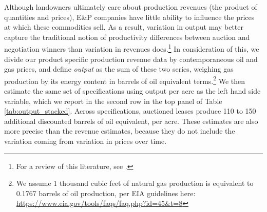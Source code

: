\documentclass[12pt]{article}
\begin{document}
Although landowners ultimately care about production revenues (the product of quantities and prices), E\&P companies have little ability to influence the prices at which these commodities sell.  As a result, variation in output may better capture the traditional notion of productivity differences between auction and negotiation winners than variation in revenues does.\footnote{For a review of this literature, see \cite{syverson2011determines}.}  In consideration of this, we divide our product specific production revenue data by contemporaneous oil and gas prices, and define \textit{output} as the sum of these two series, weighing gas production by its energy content in barrels of oil equivalent terms.\footnote{We assume 1 thousand cubic feet of natural gas production is equivalent to 0.1767 barrels of oil production, per EIA guidelines here: \url{https://www.eia.gov/tools/faqs/faq.php?id=45&t=8}}  We then estimate the same set of specifications using output per acre as the left hand side variable, which we report in the second row in the top panel of Table \ref{tab:output_stacked}. Across specifications, auctioned leases produce 110 to 150 additional discounted barrels of oil equivalent, per acre. These estimates are also more precise than the revenue estimates, because they do not include the variation coming from variation in prices over time. 
\end{document}
